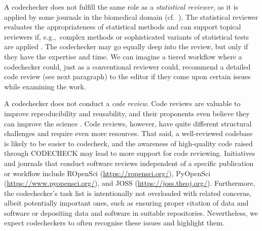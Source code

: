 \documentclass[12pt]{article}
\begin{document}
A codechecker does not fulfill the same role as a \emph{statistical
  reviewer}, as it is applied by some journals in the biomedical
domain (cf.~\cite{petrovecki_role_2009,greenwood_how_2015}).  The
statistical reviewer evaluates the appropriateness of statistical
methods \cite{greenwood_how_2015} and can support topical reviewers
if, e.g.,~complex methods or sophisticated variants of statistical
tests are applied \cite{petrovecki_role_2009}.  The codechecker may go
equally deep into the review, but only if they have the expertise and
time. We can imagine a tiered workflow where a codechecker could, just
as a conventional reviewer could, recommend a detailed code review
(see next paragraph) to the editor if they come upon certain issues while
examining the work.

A codechecker does not conduct a \emph{code review}. Code reviews are
valuable to improve reproducibility and reusability, and their
proponents even believe they can improve the science
\cite{petre_code_2014}.  Code reviews, however, have quite different
structural challenges and require even more resources. That said, a
well-reviewed codebase is likely to be easier to codecheck, and the
awareness of high-quality code raised through CODECHECK may lead to
more support for code reviewing.  Initiatives and journals that
conduct software reviews independent of a specific publication or
workflow include ROpenSci (\url{https://ropensci.org/}),
PyOpenSci (\url{https://www.pyopensci.org/}), and
JOSS (\url{https://joss.theoj.org/}).  Furthermore, the
codechecker's task list is intentionally not overloaded with related
concerns, albeit potentially important ones, such as ensuring proper
citation of data and software or depositing data and software in
suitable repositories. Nevertheless, we expect codecheckers to often
recognise these issues and highlight them.
\end{document}
